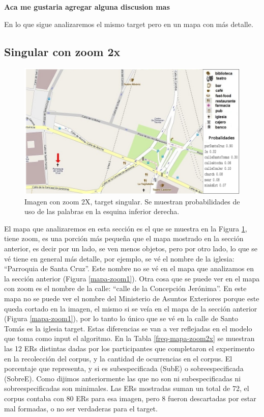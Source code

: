 \textbf{Aca me gustaria agregar alguna discusion mas}

En lo que sigue analizaremos el mismo target pero en un mapa con m\'as detalle.
\subsection{Singular con zoom 2x}
\label{sec:conzoom}

\begin{figure}[H]
\centering
\includegraphics[width=\textwidth]{images/corpus/mapa16-prob.png}
\caption{Imagen con zoom 2X, target singular. Se muestran probabilidades de uso de las palabras en la esquina inferior derecha.}
\label{mapa-zoom2x}
\end{figure}
El mapa que analizaremos en esta secci\'on es el que se muestra en la Figura \ref{mapa-zoom2x}, tiene zoom, es una porci\'on m\'as peque\~na que el mapa mostrado en la secci\'on anterior, es decir por un lado, se ven menos objetos, pero por otro lado, lo que se v\'e tiene en general m\'as detalle, por ejemplo, se v\'e el nombre de la iglesia:
 ``Parroquia de Santa Cruz''. Este nombre no se v\'e en el mapa que analizamos en la secci\'on anterior (Figura \ref{mapa-zoom1}). Otra cosa 
que se puede ver en el mapa con zoom es el nombre de la calle: ``calle de la Concepci\'on Jer\'onima''.
En este mapa no se puede ver el nombre del Ministerio de Asuntos Exteriores porque este queda cortado en la imagen, el mismo si se ve\'ia en el mapa de la secci\'on anterior (Figura \ref{mapa-zoom1}), por lo tanto lo \'unico que se v\'e en la calle de Santo Tom\'as es la iglesia target. Estas diferencias se van a ver reflejadas en el modelo que toma como input el algoritmo.
En la Tabla \ref{freq-mapa-zoom2x} se muestran las 12 ERs distintas dadas por los participantes que completaron el experimento en la recolecci\'on del corpus, y la cantidad de ocurrencias en el corpus. El porcentaje que representa, y si es subespecificada (SubE) o sobreespecificada (SobreE). Como dijimos anteriormente las que no son ni subespecificadas ni sobreespecificadas son minimales. Las ERs mostradas suman un total de 72, el corpus contaba con 80 ERs para esa imagen, pero 8 fueron descartadas por estar mal formadas, o no ser verdaderas para el target.
